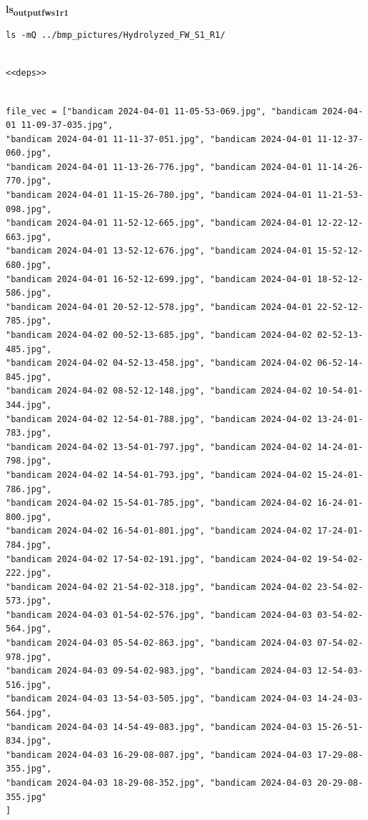 \documentclass[11pt]{article}
\begin{document}
\textbf{ls\textsubscript{output}\textsubscript{fw}\textsubscript{s1}\textsubscript{r1}}
\begin{verbatim}
ls -mQ ../bmp_pictures/Hydrolyzed_FW_S1_R1/
\end{verbatim}

\begin{verbatim}

<<deps>>

\end{verbatim}

\begin{verbatim}

file_vec = ["bandicam 2024-04-01 11-05-53-069.jpg", "bandicam 2024-04-01 11-09-37-035.jpg",
"bandicam 2024-04-01 11-11-37-051.jpg", "bandicam 2024-04-01 11-12-37-060.jpg",
"bandicam 2024-04-01 11-13-26-776.jpg", "bandicam 2024-04-01 11-14-26-770.jpg",
"bandicam 2024-04-01 11-15-26-780.jpg", "bandicam 2024-04-01 11-21-53-098.jpg",
"bandicam 2024-04-01 11-52-12-665.jpg", "bandicam 2024-04-01 12-22-12-663.jpg",
"bandicam 2024-04-01 13-52-12-676.jpg", "bandicam 2024-04-01 15-52-12-680.jpg",
"bandicam 2024-04-01 16-52-12-699.jpg", "bandicam 2024-04-01 18-52-12-586.jpg",
"bandicam 2024-04-01 20-52-12-578.jpg", "bandicam 2024-04-01 22-52-12-785.jpg",
"bandicam 2024-04-02 00-52-13-685.jpg", "bandicam 2024-04-02 02-52-13-485.jpg",
"bandicam 2024-04-02 04-52-13-458.jpg", "bandicam 2024-04-02 06-52-14-845.jpg",
"bandicam 2024-04-02 08-52-12-148.jpg", "bandicam 2024-04-02 10-54-01-344.jpg",
"bandicam 2024-04-02 12-54-01-788.jpg", "bandicam 2024-04-02 13-24-01-783.jpg",
"bandicam 2024-04-02 13-54-01-797.jpg", "bandicam 2024-04-02 14-24-01-798.jpg",
"bandicam 2024-04-02 14-54-01-793.jpg", "bandicam 2024-04-02 15-24-01-786.jpg",
"bandicam 2024-04-02 15-54-01-785.jpg", "bandicam 2024-04-02 16-24-01-800.jpg",
"bandicam 2024-04-02 16-54-01-801.jpg", "bandicam 2024-04-02 17-24-01-784.jpg",
"bandicam 2024-04-02 17-54-02-191.jpg", "bandicam 2024-04-02 19-54-02-222.jpg",
"bandicam 2024-04-02 21-54-02-318.jpg", "bandicam 2024-04-02 23-54-02-573.jpg",
"bandicam 2024-04-03 01-54-02-576.jpg", "bandicam 2024-04-03 03-54-02-564.jpg",
"bandicam 2024-04-03 05-54-02-863.jpg", "bandicam 2024-04-03 07-54-02-978.jpg",
"bandicam 2024-04-03 09-54-02-983.jpg", "bandicam 2024-04-03 12-54-03-516.jpg",
"bandicam 2024-04-03 13-54-03-505.jpg", "bandicam 2024-04-03 14-24-03-564.jpg",
"bandicam 2024-04-03 14-54-49-083.jpg", "bandicam 2024-04-03 15-26-51-834.jpg",
"bandicam 2024-04-03 16-29-08-087.jpg", "bandicam 2024-04-03 17-29-08-355.jpg",
"bandicam 2024-04-03 18-29-08-352.jpg", "bandicam 2024-04-03 20-29-08-355.jpg"
]
\end{verbatim}
\end{document}

